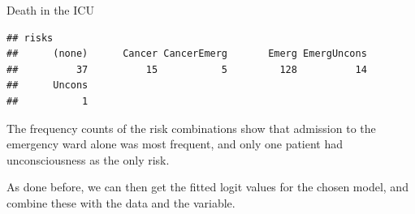 \documentclass[11pt]{book}
\renewenvironment{knitrout}{\small\renewcommand{\baselinestretch}{.85}}{} %
\begin{document}
\begin{Example}[icu1]{Death in the ICU}
\begin{knitrout}\footnotesize
{}\color{fgcolor}\begin{kframe}
\begin{alltt}
 \hlkwb{<-} \hlstd{ICU[,} \hlstd{(}\hlstd{,} \hlstd{,} \hlstd{)]}
\hlstd{risks[,}\hlstd{]} \hlkwb{<-} \hlstd{(risks[,}\hlstd{]}\hlopt{==}\hlstd{,} \hlstd{,} \hlstd{)}
\hlstd{risks[,}\hlstd{]} \hlkwb{<-} \hlstd{(risks[,}\hlstd{]}\hlopt{==}\hlstd{,} \hlstd{,} \hlstd{)}
\hlstd{risks[,}\hlstd{]} \hlkwb{<-} \hlstd{(risks[,}\hlstd{]}\hlopt{==}\hlstd{,} \hlstd{,} \hlstd{)}
 \hlkwb{<-}   \hlstd{=}\hlstd{)}
\hlstd{risks[risks}\hlopt{==}\hlstd{]} \hlkwb{<-} 
\end{alltt}
\end{kframe}
\end{knitrout}
\begin{knitrout}\footnotesize
{}\color{fgcolor}\begin{kframe}
\begin{alltt}
\end{alltt}
\begin{verbatim}
## risks
##      (none)      Cancer CancerEmerg       Emerg EmergUncons 
##          37          15           5         128          14 
##      Uncons 
##           1
\end{verbatim}
\end{kframe}
\end{knitrout}
The frequency counts of the risk combinations show that admission to the
emergency ward alone was most frequent, and only one patient had
unconsciousness as the only risk.

As done before, we can then get the fitted logit values for the chosen model, 
and combine these with the data and the  variable.

\begin{knitrout}
\color{fgcolor}\begin{kframe}
\begin{alltt}
 \hlkwb{<-}  \hlopt{~}  \hlopt{+}   \hlopt{+}  \hlopt{+} 
                 
 \hlkwb{<-}   \hlstd{=}
\end{alltt}
\end{kframe}
\end{knitrout}


\end{Example}
\end{document}
